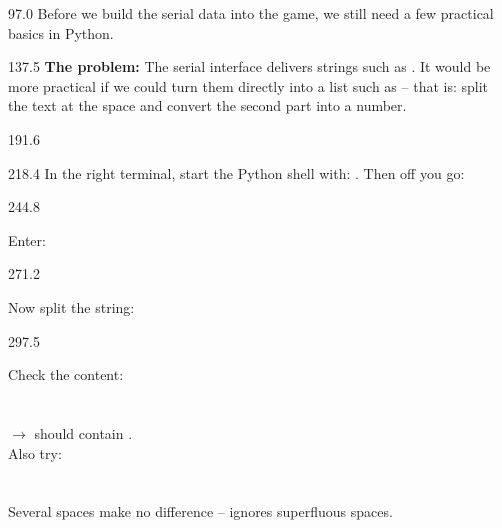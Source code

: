 \documentclass{aslab}
\begin{document}
\begin{region}[pitch=13.2]{97.0}
Before we build the serial data into the game, we still need a few practical
basics in Python.
\end{region}

\begin{region}[pitch=13.4]{137.5}
\textbf{The problem:} The serial interface delivers strings such as
. It would be more practical if we could turn them directly
into a list such as \code{["X", 512]} -- that is: split the text at the
space and convert the second part into a number.
\end{region}

\begin{region}{191.6}
\end{region}

\begin{region}{218.4}
In the right terminal, start the Python shell with: . Then off
you go:
\end{region}

\begin{region}[pitch=13.4]{244.8}
\begin{tasks}
\item Enter:\\
  \tcode{>>> }
\end{tasks}
\end{region}

\begin{region}[pitch=13.4]{271.2}
\begin{tasks}[start=2]
\item Now split the string:\\
  \tcode{>>> }
\end{tasks}
\end{region}

\begin{region}[pitch=13.42]{297.5}
\begin{tasks}[start=3]
\item Check the content:\\
  \tcode{>>> }\\
  \tcode{>>> }\\
  $\rightarrow$  should contain \code{["X", "512"]}.\\
  Also try:\\
  \tcode{>>> }\\
  \tcode{>>> }\\
  Several spaces make no difference --  ignores superfluous
  spaces.
\end{tasks}
\end{region}
\end{document}
